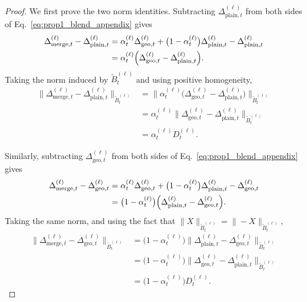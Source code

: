 \documentclass{article}
\begin{document}
\begin{proof}
We first prove the two norm identities. Subtracting \(\Delta_{\mathrm{plain},t}^{(\ell)}\) from both sides of Eq.~\eqref{eq:prop1_blend_appendix} gives
\begin{align}
\Delta_{\mathrm{merge},t}^{(\ell)}-\Delta_{\mathrm{plain},t}^{(\ell)}
&=
\alpha_t^{(\ell)} \Delta_{\mathrm{geo},t}^{(\ell)}
+
\bigl(1-\alpha_t^{(\ell)}\bigr)\Delta_{\mathrm{plain},t}^{(\ell)}
-
\Delta_{\mathrm{plain},t}^{(\ell)}
\nonumber\\
&=
\alpha_t^{(\ell)}
\Bigl(
\Delta_{\mathrm{geo},t}^{(\ell)}-\Delta_{\mathrm{plain},t}^{(\ell)}
\Bigr).
\label{eq:prop1_plain_diff}
\end{align}
Taking the norm induced by \(\widetilde B_t^{(\ell)}\) and using positive homogeneity,
\begin{align}
\bigl\|
\Delta_{\mathrm{merge},t}^{(\ell)}-\Delta_{\mathrm{plain},t}^{(\ell)}
\bigr\|_{\widetilde B_t^{(\ell)}}
&=
\bigl\|
\alpha_t^{(\ell)}
\bigl(
\Delta_{\mathrm{geo},t}^{(\ell)}-\Delta_{\mathrm{plain},t}^{(\ell)}
\bigr)
\bigr\|_{\widetilde B_t^{(\ell)}}
\nonumber\\
&=
\alpha_t^{(\ell)}
\bigl\|
\Delta_{\mathrm{geo},t}^{(\ell)}-\Delta_{\mathrm{plain},t}^{(\ell)}
\bigr\|_{\widetilde B_t^{(\ell)}}
\nonumber\\
&=
\alpha_t^{(\ell)} D_t^{(\ell)}.
\label{eq:prop1_first_identity}
\end{align}

Similarly, subtracting \(\Delta_{\mathrm{geo},t}^{(\ell)}\) from both sides of Eq.~\eqref{eq:prop1_blend_appendix} gives
\begin{align}
\Delta_{\mathrm{merge},t}^{(\ell)}-\Delta_{\mathrm{geo},t}^{(\ell)}
&=
\alpha_t^{(\ell)} \Delta_{\mathrm{geo},t}^{(\ell)}
+
\bigl(1-\alpha_t^{(\ell)}\bigr)\Delta_{\mathrm{plain},t}^{(\ell)}
-
\Delta_{\mathrm{geo},t}^{(\ell)}
\nonumber\\
&=
\bigl(1-\alpha_t^{(\ell)}\bigr)
\Bigl(
\Delta_{\mathrm{plain},t}^{(\ell)}-\Delta_{\mathrm{geo},t}^{(\ell)}
\Bigr).
\label{eq:prop1_geo_diff}
\end{align}
Taking the same norm, and using the fact that \(\|X\|_{\widetilde B_t^{(\ell)}}=\|-X\|_{\widetilde B_t^{(\ell)}}\),
\begin{align}
\bigl\|
\Delta_{\mathrm{merge},t}^{(\ell)}-\Delta_{\mathrm{geo},t}^{(\ell)}
\bigr\|_{\widetilde B_t^{(\ell)}}
&=
\bigl(1-\alpha_t^{(\ell)}\bigr)
\bigl\|
\Delta_{\mathrm{plain},t}^{(\ell)}-\Delta_{\mathrm{geo},t}^{(\ell)}
\bigr\|_{\widetilde B_t^{(\ell)}}
\nonumber\\
&=
\bigl(1-\alpha_t^{(\ell)}\bigr)
\bigl\|
\Delta_{\mathrm{geo},t}^{(\ell)}-\Delta_{\mathrm{plain},t}^{(\ell)}
\bigr\|_{\widetilde B_t^{(\ell)}}
\nonumber\\
&=
\bigl(1-\alpha_t^{(\ell)}\bigr) D_t^{(\ell)}.
\label{eq:prop1_second_identity}
\end{align}


\end{proof}
\end{document}
